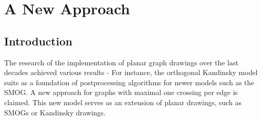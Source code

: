 \section{A New Approach}
\subsection{Introduction}
The research of the implementation of planar graph drawings over the last decades achieved various results - For instance, the orthogonal Kandinsky model suits as a foundation of postprocessing algorithms for newer models such as the SMOG. A new approach for graphs with maximal one crossing per edge is claimed. This new model serves as an extension of planar drawings, such as SMOGs or Kandinsky drawings.

